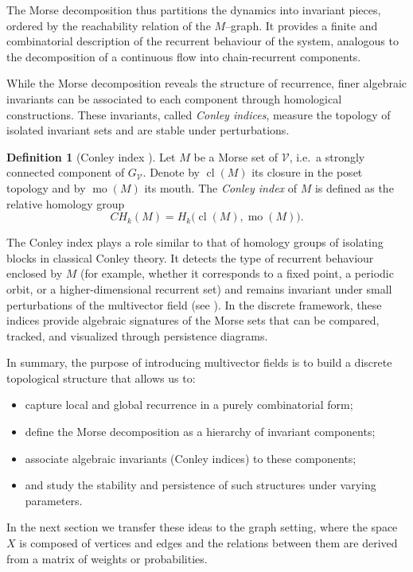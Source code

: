 \documentclass{article}
\theoremstyle{definition}
\newtheorem{definition}{Definition}
\theoremstyle{plain}
\theoremstyle{remark}
\newcommand{\1}{\mathbbm{1}}  %
\begin{document}
The Morse decomposition thus partitions the dynamics into invariant
pieces, ordered by the reachability relation of the $M$--graph.  It
provides a finite and combinatorial description of the recurrent
behaviour of the system, analogous to the decomposition of a continuous
flow into chain-recurrent components.

While the Morse decomposition reveals the structure of recurrence,
finer algebraic invariants can be associated to each component through
homological constructions.  These invariants, called \emph{Conley
indices}, measure the topology of isolated invariant sets and are stable
under perturbations.

\begin{definition}[Conley index \cite{lipinski2019conley}]
Let $M$ be a Morse set of $\mathcal{V}$, i.e.\ a strongly connected
component of $G_{\mathcal{V}}$.  Denote by $\operatorname{cl}(M)$ its
closure in the poset topology and by $\operatorname{mo}(M)$ its mouth.
The \emph{Conley index} of $M$ is defined as the relative homology group
\[
CH_k(M) = H_k\big(\operatorname{cl}(M), \operatorname{mo}(M)\big).
\]
\end{definition}

The Conley index plays a role similar to that of homology groups of
isolating blocks in classical Conley theory.  It detects the type of
recurrent behaviour enclosed by $M$ (for example, whether it corresponds
to a fixed point, a periodic orbit, or a higher-dimensional recurrent
set) and remains invariant under small perturbations of the multivector
field (see \cite{mrozek2022combinatorial}).  In the discrete framework, these indices provide algebraic
signatures of the Morse sets that can be compared, tracked, and
visualized through persistence diagrams.

\medskip

In summary, the purpose of introducing multivector fields is to build a
discrete topological structure that allows us to:
\begin{itemize}
    \item capture local and global recurrence in a purely combinatorial
    form;
    \item define the Morse decomposition as a hierarchy of invariant
    components;
    \item associate algebraic invariants (Conley indices) to these
    components;
    \item and study the stability and persistence of such structures
    under varying parameters.
\end{itemize}
In the next section we transfer these ideas to the graph setting,
where the space $X$ is composed of vertices and edges and the relations
between them are derived from a matrix of weights or probabilities.
\end{document}
